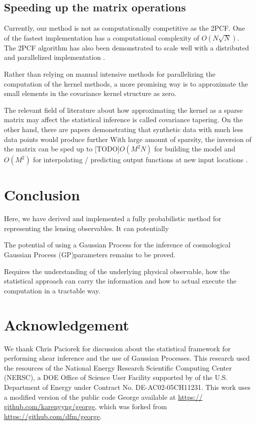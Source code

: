 
\subsection{Speeding up the matrix operations}
Currently, our method is not as computationally competitive as the 2PCF. One of
the fastest implementation has a computational complexity of $O(N\sqrt{N})$.
The 2PCF algorithm has also been demonstrated to scale well with a distributed and parallelized
implementation \citep{Chhugani2012}.

Rather than relying on manual intensive methods for parallelizing the
computation of the kernel methods, a more promising way is to approximate the
small elements in the covariance kernel structure as zero. 

The relevant field of literature about how approximating the kernel as a sparse
matrix may affect the
statistical inference is called covariance tapering. 
On the other hand, \citep{Snelson2006}
there are papers demonstrating that synthetic data with much less data points  
would produce further 
With large amount of
sparsity, the inversion of the matrix can be sped up to [TODO]$O(M^2N)$ for
building the model and $O(M^2)$ for interpolating / predicting output functions
at new input locations \citep{Snelson2006}.
  

\section{Conclusion}
Here, we have derived and implemented a fully probabilistic method for 
representing the lensing observables. It can potentially  

The potential of using a Gaussian Process for the inference of cosmological 
Gaussian Process (GP)parameters remains to be proved. 

Requires the understanding of the underlying physical observable, how the statistical
approach can carry the information and how to actual execute the computation in
a tractable way.


\section{Acknowledgement}
We thank Chris Paciorek for discussion about the statistical
framework for performing shear inference and the
use of Gaussian Processes.
This research
used the resources of the National Energy Research Scientific 
Computing Center (NERSC), a DOE Office of Science
User Facility supported by 
of the U.S. Department of Energy under Contract No.
DE-AC02-05CH11231.
 This work uses a modified version
of the public code {\sc George} available at \href{https://
github.com/karenyyng/george}{https://
github.com/karenyyng/george}, which was forked from \\
\href{https://github.com/dfm/george}{https://github.com/dfm/george}.



